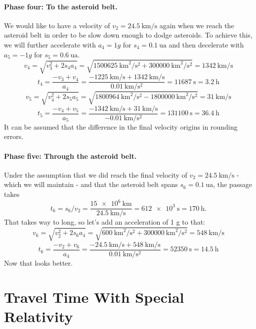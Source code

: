 \documentclass[10pt]{article}
\numberwithin{equation}{section}
\begin{document}
	\paragraph{Phase four: To the asteroid belt.}
	
	We would like to have a velocity of $v_2 = \SI{24.5}{\km\per\s}$ again when we reach the asteroid belt in order to be slow down enough to dodge asteroids. To achieve this, we will further accelerate with $a_4 = 1 g$ for $s_4 = \SI{0.1}{\astronomicalunit}$ and then decelerate with $a_5 = -1 g$ for $s_5 = \SI{0.6}{\astronomicalunit}$.
	\begin{equation}
		v_4 = \sqrt{v^2_3 + 2s_4 a_4}
		= \sqrt{\SI{1500625}{\km\squared\per\s\squared} + \SI{300000}{\km\squared\per\s\squared}}
		= \SI{1342}{\km\per\s} \end{equation}
	\begin{equation}
		t_4 = \frac{-v_3 + v_4}{a_4}
		= \frac{\SI{-1225}{\km\per\s} + \SI{1342}{\km\per\s}}{\SI{0.01}{\km\per\s\squared}}
		= \SI{11687}{\s} = \SI{3.2}{\hour} \end{equation}
	\begin{equation}
		v_5 = \sqrt{v^2_4 + 2s_5 a_5}
		= \sqrt{\SI{1800964}{\km\squared\per\s\squared} - \SI{1800000}{\km\squared\per\s\squared}}
		= \SI{31}{\km\per\s} \end{equation}
	\begin{equation}
		t_5 = \frac{-v_4 + v_5}{a_5}
		= \frac{\SI{-1342}{\km\per\s} + \SI{31}{\km\per\s}}{\SI{-0.01}{\km\per\s\squared}}
		= \SI{131100}{\s} = \SI{36.4}{\hour} \end{equation}
	It can be assumed that the difference in the final velocity origins in rounding errors.
	
	\paragraph{Phase five: Through the asteroid belt.}
	
	Under the assumption that we did reach the final velocity of $v_2 = \SI{24.5}{\km\per\s}$ - which we will maintain - and that the asteroid belt spans $s_6 = \SI{0.1}{\astronomicalunit}$, the passage takes
	\begin{equation}
		t_6 = s_6 / v_2 = \frac{\SI{15e+6}{\km}}{\SI{24.5}{\km\per\s}} = \SI{612e+3}{\s}
		= \SI{170}{\hour}. \end{equation}
	That takes way to long, so let's add an acceleration of 1 g to that:	
	\begin{equation}
		v_6 = \sqrt{v^2_2 + 2s_6 a_4}
		= \sqrt{\SI{600}{\km\squared\per\s\squared} + \SI{300000}{\km\squared\per\s\squared}}
		= \SI{548}{\km\per\s} \end{equation}
	\begin{equation}
		t_6 = \frac{-v_2 + v_6}{a_4}
		= \frac{\SI{-24.5}{\km\per\s} + \SI{548}{\km\per\s}}{\SI{0.01}{\km\per\s\squared}}
		= \SI{52350}{\s} = \SI{14.5}{\hour} \end{equation}
	Now that looks better.
	
	\section{Travel Time With Special Relativity}
\end{document}
